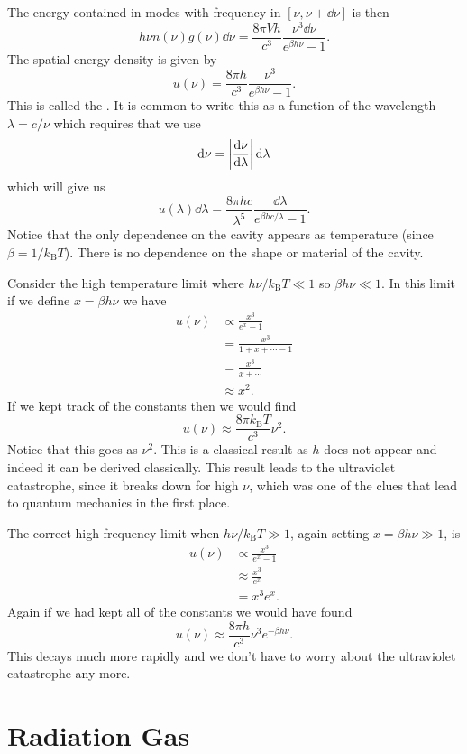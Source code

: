 \documentclass[a4paper]{article}
\newcommand{\boltzmann}{k_\mathrm{B}}
\newcommand{\mean}[1]{\overline{#1}}
\begin{document}
    The energy contained in modes with frequency in \([\nu, \nu + \dd{\nu}]\) is then
    \[h\nu\mean{n}(\nu)g(\nu)\dd{\nu} = \frac{8\pi Vh}{c^3} \frac{\nu^3\dd{\nu}}{e^{\beta h\nu} - 1}.\]
    The spatial energy density is given by
    \[u(\nu) = \frac{8\pi h}{c^3} \frac{\nu^3}{e^{\beta h\nu} - 1}.\]
    This is called the .
    It is common to write this as a function of the wavelength \(\lambda = c/\nu\) which requires that we use
    \[\dd{\nu} = \abs{\dv{\nu}{\lambda}} \dd{\lambda}\]
    which will give us
    \[u(\lambda)\dd{\lambda} = \frac{8\pi hc}{\lambda^5}\frac{\dd{\lambda}}{e^{\beta hc/\lambda} - 1}.\]
    Notice that the only dependence on the cavity appears as temperature (since \(\beta = 1/\boltzmann T\)).
    There is no dependence on the shape or material of the cavity.
    
    Consider the high temperature limit where \(h\nu/\boltzmann T \ll 1\) so \(\beta h\nu \ll 1\).
    In this limit if we define \(x = \beta h \nu\) we have
    \begin{align*}
        u(\nu) &\propto \frac{x^3}{e^{x} - 1}\\
        &= \frac{x^3}{1 + x + \dotsb - 1}\\
        &= \frac{x^3}{x + \dotsb}\\
        &\approx x^2.
    \end{align*}
    If we kept track of the constants then we would find
    \[u(\nu) \approx \frac{8\pi\boltzmann T}{c^3}\nu^2.\]
    Notice that this goes as \(\nu^2\).
    This is a classical result as \(h\) does not appear and indeed it can be derived classically.
    This result leads to the ultraviolet catastrophe, since it breaks down for high \(\nu\), which was one of the clues that lead to quantum mechanics in the first place.
    
    The correct high frequency limit when \(h\nu/\boltzmann T\gg 1\), again setting \(x = \beta h\nu \gg 1\), is
    \begin{align*}
        u(\nu) &\propto \frac{x^3}{e^x -1}\\
        &\approx \frac{x^3}{e^x}\\
        &= x^3e^x.
    \end{align*}
    Again if we had kept all of the constants we would have found
    \[u(\nu) \approx \frac{8\pi h}{c^3}\nu^3e^{-\beta h\nu}.\]
    This decays much more rapidly and we don't have to worry about the ultraviolet catastrophe any more.
    
    \section{Radiation Gas}
\end{document}

